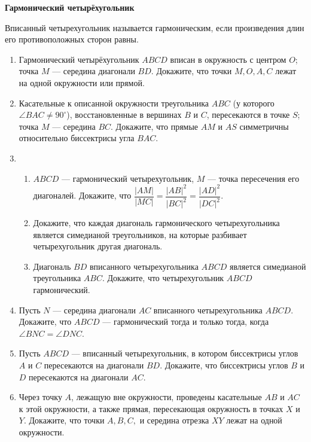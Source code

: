 \documentclass{article}
\begin{document}
\large

\begin{center}
\textbf{Гармонический четырёхугольник}
\end{center}

\begin{definition}
	Вписанный четырехугольник называется гармоническим, если произведения длин
	его противоположных сторон равны.
\end{definition}

\begin{enumerate}[label*=\protect\fbox{\arabic{enumi}}]

\item Гармонический четырёхугольник $ABCD$ вписан в окружность с центром $O$; точка $M$ — середина диагонали $BD$. Докажите, что точки $M, O, A, C$ лежат на одной
окружности или прямой.

\item Касательные к описанной окружности треугольника $ABC$ (у которого $\angle BAC \neq 90^\circ$),
восстановленные в вершинах $B$ и $C$, пересекаются в точке $S$; точка $M$ — середина $BC$.
Докажите, что прямые $AM$ и $AS$ симметричны относительно биссектрисы угла $BAC$.

\item  
\begin{enumerate} 
	\item $ABCD$ — гармонический четырехугольник, $M$ — точка пересечения его диагоналей.
Докажите, что
$\dfrac{|AM|}{|MC|}=\dfrac{|AB|^2}{|BC|^2}=\dfrac{|AD|^2}{|DC|^2}.$
	\item Докажите, что каждая диагональ гармонического четырехугольника является симедианой
треугольников, на которые разбивает четырехугольник другая диагональ.
	\item Диагональ $BD$ вписанного четырехугольника $ABCD$ является симедианой треугольника
$ABC$. Докажите, что четырехугольник $ABCD$ гармонический.
\end{enumerate}

\item Пусть $N$ — середина диагонали $AC$ вписанного четырехугольника $ABCD$. Докажите, что
$ABCD$ — гармонический тогда и только тогда, когда $\angle BNC = \angle DNC$.

\item Пусть $ABCD$ — вписанный четырехугольник, в котором биссектрисы углов $A$ и $C$ пересекаются
на диагонали $BD$. Докажите, что биссектрисы углов $B$ и $D$ пересекаются на диагонали $AC$.

\item Через точку $A$, лежащую вне окружности, проведены касательные $AB$ и $AC$ к этой окружности, а также прямая, пересекающая окружность в точках $X$ и $Y$. Докажите, что точки $A, B, C,$ и середина отрезка $XY$ лежат на одной окружности.


\end{enumerate}
\end{document}

